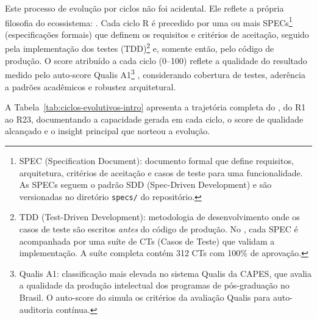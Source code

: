Este processo de evolução por ciclos não foi acidental. Ele reflete a
própria filosofia do ecossistema: . Cada ciclo R é
precedido por uma ou mais SPECs\footnote{SPEC (Specification Document):
documento formal que define requisitos, arquitetura, critérios de aceitação
e casos de teste para uma funcionalidade. As SPECs seguem o padrão SDD
(Spec-Driven Development) e são versionadas no diretório \texttt{specs/}
do repositório.} (especificações formais) que definem os
requisitos e critérios de aceitação, seguido pela implementação dos testes
(TDD)\footnote{TDD (Test-Driven Development): metodologia de desenvolvimento
onde os casos de teste são escritos \emph{antes} do código de produção.
No \opencodeeco{}, cada SPEC é acompanhada por uma suíte de CTs (Casos de
Teste) que validam a implementação. A suíte completa contém 312 CTs com
100\% de aprovação.} e, somente então, pelo código de produção. O score
atribuído a cada ciclo (0--100) reflete a qualidade do resultado medido pelo
auto-score Qualis A1\footnote{Qualis A1: classificação mais elevada no
sistema Qualis da CAPES, que avalia a qualidade da produção intelectual
dos programas de pós-graduação no Brasil. O auto-score do \opencodeeco{}
simula os critérios da avaliação Qualis para auto-auditoria contínua.}
\cite{capes2022qualis}, considerando cobertura de testes,
aderência a padrões acadêmicos e robustez arquitetural.

A Tabela~\ref{tab:ciclos-evolutivos-intro} apresenta a trajetória completa do
\opencodeeco{}, do R1 ao R23, documentando a capacidade gerada em cada
ciclo, o score de qualidade alcançado e o insight principal que norteou a
evolução.

